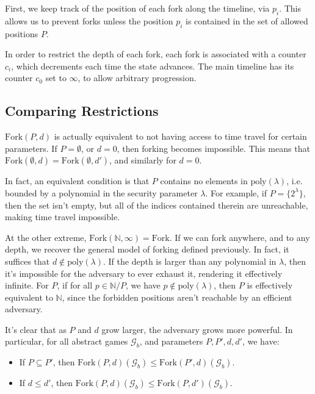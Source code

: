 First, we keep track of the position of each fork along the timeline,
via $p_i$. 
This allows us to prevent forks unless the position $p_i$ is contained
in the set of allowed positions $P$.

In order to restrict the depth of each fork, each fork is associated
with a counter $c_i$, which decrements each time the state advances.
The main timeline has its counter $c_0$ set to $\infty$, to allow
arbitrary progression.

\subsection{Comparing Restrictions}

$\text{Fork}(P, d)$ is actually equivalent to not having access
to time travel for certain parameters.
If $P = \emptyset$, or $d = 0$, then forking becomes
impossible.
This means that $\text{Fork}(\emptyset, d) = \text{Fork}(\emptyset, d')$,
and similarly for $d = 0$.

In fact, an equivalent condition is that $P$ contains no elements
in $\text{poly}(\lambda)$, i.e. bounded by a polynomial in the security
parameter $\lambda$.
For example, if $P = \{2^\lambda\}$, then the set isn't empty, but all
of the indices contained therein are unreachable, making time travel impossible.

At the other extreme, $\text{Fork}(\mathbb{N}, \infty) = \text{Fork}$.
If we can fork anywhere, and to any depth, we recover the general
model of forking defined previously.
In fact, it suffices that $d \notin \text{poly}(\lambda)$.
If the depth is larger than any polynomial in $\lambda$,
then it's impossible for the adversary to ever exhaust it, rendering
it effectively infinite.
For $P$, if for all $p \in \mathbb{N} / P$, we have $p \notin \text{poly}(\lambda)$,
then $P$ is effectively equivalent to $\mathbb{N}$, since the forbidden
positions aren't reachable by an efficient adversary.

It's clear that as $P$ and $d$ grow larger, the adversary grows
more powerful.
In particular, for all abstract games $\mathcal{G}_b$, and parameters
$P, P', d, d'$, we have:

\begin{itemize}
    \item If $P \subseteq P'$, then $\text{Fork}(P, d)(\mathcal{G}_b) \leq \text{Fork}(P', d)(\mathcal{G}_b)$.
    \item If $d \leq d'$, then $\text{Fork}(P, d)(\mathcal{G}_b) \leq \text{Fork}(P, d')(\mathcal{G}_b)$.
\end{itemize}

